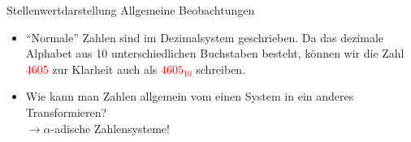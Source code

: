 \begin{frame}{Stellenwertdarstellung}
    Allgemeine Beobachtungen
    \begin{itemize}
        \item ``Normale'' Zahlen sind im Dezimalsystem geschrieben. Da das dezimale Alphabet aus 10 unterschiedlichen Buchstaben besteht, können wir die Zahl \textcolor{red}{4605} zur Klarheit auch als \textcolor{red}{$4605_{10}$} schreiben.\\
        
        \item<3-> Wie kann man Zahlen allgemein vom einen System in ein anderes Transformieren?\\
        $\rightarrow \alpha$-adische Zahlensysteme!
    \end{itemize}
\end{frame}

